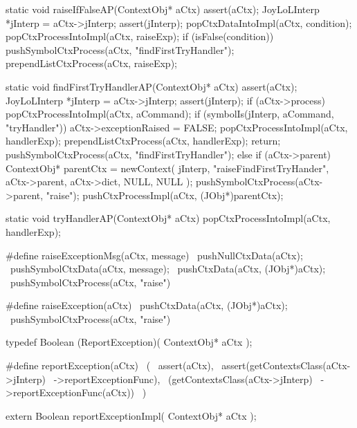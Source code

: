 \startCCode
static void raiseIfFalseAP(ContextObj* aCtx) {
  assert(aCtx);
  JoyLoLInterp *jInterp = aCtx->jInterp;
  assert(jInterp);
  popCtxDataIntoImpl(aCtx, condition);
  popCtxProcessIntoImpl(aCtx, raiseExp);
  if (isFalse(condition)) {
    pushSymbolCtxProcess(aCtx, "findFirstTryHandler");
    prependListCtxProcess(aCtx, raiseExp);
  }
}
\stopCCode

\startCCode
static void findFirstTryHandlerAP(ContextObj* aCtx) {
  assert(aCtx);
  JoyLoLInterp *jInterp = aCtx->jInterp;
  assert(jInterp);
  if (aCtx->process) {
    popCtxProcessIntoImpl(aCtx, aCommand);
    if (symbolIs(jInterp, aCommand, "tryHandler")) {
      aCtx->exceptionRaised = FALSE;
      popCtxProcessIntoImpl(aCtx, handlerExp);
      prependListCtxProcess(aCtx, handlerExp);
      return;
    }
    pushSymbolCtxProcess(aCtx, "findFirstTryHandler");
  } else {
    if (aCtx->parent) {
      ContextObj* parentCtx = newContext(
        jInterp,
        "raiseFindFirstTryHander",
        aCtx->parent,
        aCtx->dict,
        NULL,
        NULL
      );
      pushSymbolCtxProcess(aCtx->parent, "raise");
      pushCtxProcessImpl(aCtx, (JObj*)parentCtx);
    }
  }
}
\stopCCode

\startCCode
static void tryHandlerAP(ContextObj* aCtx) {
  popCtxProcessIntoImpl(aCtx, handlerExp);
}
\stopCCode

\startCHeader
#define raiseExceptionMsg(aCtx, message)  \
  pushNullCtxData(aCtx);                  \
  pushSymbolCtxData(aCtx, message);       \
  pushCtxData(aCtx, (JObj*)aCtx);         \
  pushSymbolCtxProcess(aCtx, "raise")

#define raiseException(aCtx)          \
  pushCtxData(aCtx, (JObj*)aCtx);     \
  pushSymbolCtxProcess(aCtx, "raise")
\stopCHeader

\startCHeader
typedef Boolean (ReportException)(
  ContextObj* aCtx
);

#define reportException(aCtx)               \
  (                                         \
    assert(aCtx),                           \
    assert(getContextsClass(aCtx->jInterp)  \
      ->reportExceptionFunc),               \
    (getContextsClass(aCtx->jInterp)        \
      ->reportExceptionFunc(aCtx))          \
  )
\stopCHeader

\startCHeader
extern Boolean reportExceptionImpl(
  ContextObj* aCtx
);
\stopCHeader
\setCHeaderStream{public}

